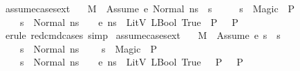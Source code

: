 \begin{isabellebody}
\endisatagproof
{\isafoldproof}%
%
\isadelimproof
\isanewline
%
\endisadelimproof
\isanewline
{}\isamarkupfalse%
\ assume{\isacharunderscore}{\kern0pt}cases{\isacharunderscore}{\kern0pt}ext{\isacharcolon}{\kern0pt}\ \isanewline
\ \ {\isachardoublequoteopen}{\isasymlbrakk}M{\isacharcomma}{\kern0pt}{\isasymLambda}{\isacharcomma}{\kern0pt}{\isasymGamma}{\isacharcomma}{\kern0pt}{\isasymDelta}\ {\isasymturnstile}\ {\isasymlangle}Assume\ e{\isacharcomma}{\kern0pt}\ Normal\ n{\isacharunderscore}{\kern0pt}s{\isasymrangle}\ {\isasymrightarrow}\ s{\isacharsemicolon}{\kern0pt}\ \isanewline
\ \ \ \ s\ {\isacharequal}{\kern0pt}\ Magic\ {\isasymLongrightarrow}\ P{\isacharsemicolon}{\kern0pt}\ \isanewline
\ \ \ \ s\ {\isacharequal}{\kern0pt}\ Normal\ n{\isacharunderscore}{\kern0pt}s\ {\isasymLongrightarrow}\ {\isasymLambda}{\isacharcomma}{\kern0pt}{\isasymGamma}{\isacharcomma}{\kern0pt}{\isasymDelta}\ {\isasymturnstile}\ {\isasymlangle}e{\isacharcomma}{\kern0pt}\ n{\isacharunderscore}{\kern0pt}s{\isasymrangle}\ {\isasymDown}\ LitV\ {\isacharparenleft}{\kern0pt}LBool\ True{\isacharparenright}{\kern0pt}\ {\isasymLongrightarrow}\ P\ {\isasymrbrakk}\ {\isasymLongrightarrow}\ P{\isachardoublequoteclose}\isanewline
%
\isadelimproof
\ \ %
\endisadelimproof
%
\isatagproof
{}\isamarkupfalse%
\ {\isacharparenleft}{\kern0pt}erule\ red{\isacharunderscore}{\kern0pt}cmd{\isachardot}{\kern0pt}cases{\isacharsemicolon}{\kern0pt}\ simp{\isacharparenright}{\kern0pt}%
\endisatagproof
{\isafoldproof}%
%
\isadelimproof
\isanewline
%
\endisadelimproof
\isanewline
{}\isamarkupfalse%
\ assume{\isacharunderscore}{\kern0pt}cases{\isacharunderscore}{\kern0pt}ext{\isacharunderscore}{\kern0pt}{}{\isacharcolon}{\kern0pt}\ \isanewline
\ \ {\isachardoublequoteopen}{\isasymlbrakk}M{\isacharcomma}{\kern0pt}{\isasymLambda}{\isacharcomma}{\kern0pt}{\isasymGamma}{\isacharcomma}{\kern0pt}{\isasymDelta}\ {\isasymturnstile}\ {\isasymlangle}Assume\ e{\isacharcomma}{\kern0pt}\ s{\isasymrangle}\ {\isasymrightarrow}\ s{\isacharprime}{\kern0pt}{\isacharsemicolon}{\kern0pt}\ \isanewline
\ \ \ \ s\ {\isacharequal}{\kern0pt}\ Normal\ n{\isacharunderscore}{\kern0pt}s{\isacharsemicolon}{\kern0pt}\isanewline
\ \ \ \ s{\isacharprime}{\kern0pt}\ {\isacharequal}{\kern0pt}\ Magic\ {\isasymLongrightarrow}\ P{\isacharsemicolon}{\kern0pt}\ \isanewline
\ \ \ \ s{\isacharprime}{\kern0pt}\ {\isacharequal}{\kern0pt}\ Normal\ n{\isacharunderscore}{\kern0pt}s\ {\isasymLongrightarrow}\ {\isasymLambda}{\isacharcomma}{\kern0pt}{\isasymGamma}{\isacharcomma}{\kern0pt}{\isasymDelta}\ {\isasymturnstile}\ {\isasymlangle}e{\isacharcomma}{\kern0pt}\ n{\isacharunderscore}{\kern0pt}s{\isasymrangle}\ {\isasymDown}\ LitV\ {\isacharparenleft}{\kern0pt}LBool\ True{\isacharparenright}{\kern0pt}\ {\isasymLongrightarrow}\ \ P\ {\isasymrbrakk}\ {\isasymLongrightarrow}\ P{\isachardoublequoteclose}\isanewline

\end{isabellebody}
